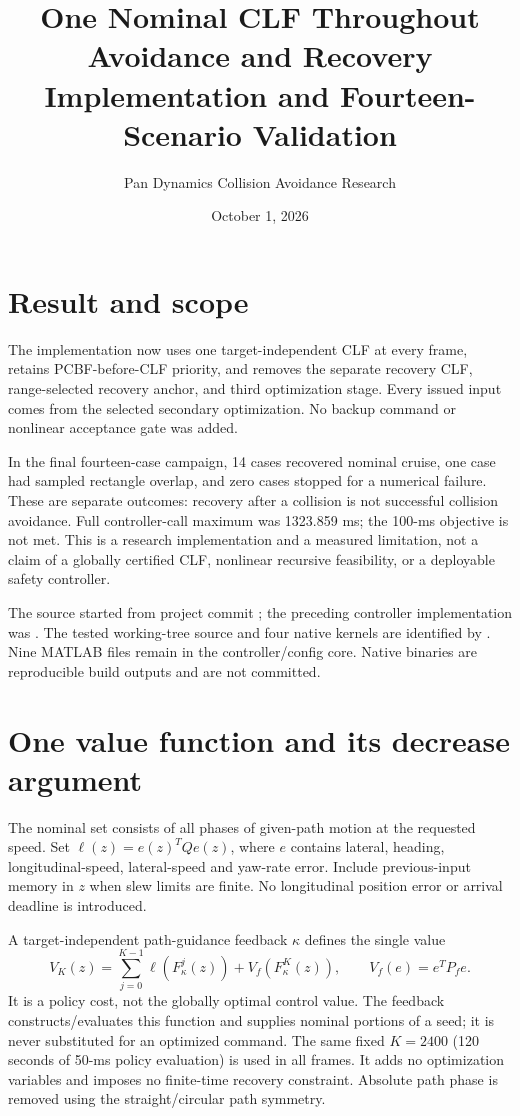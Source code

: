 \documentclass[11pt]{article}
\title{One Nominal CLF Throughout Avoidance and Recovery\\Implementation and Fourteen-Scenario Validation}
\author{Pan Dynamics Collision Avoidance Research}
\date{October 1, 2026}
\begin{document}
\maketitle
\section{Result and scope}
The implementation now uses one target-independent CLF at every frame,
retains PCBF-before-CLF priority, and removes the separate recovery CLF,
range-selected recovery anchor, and third optimization stage. Every issued
input comes from the selected secondary optimization. No backup command or
nonlinear acceptance gate was added.

In the final fourteen-case campaign, 14 cases recovered nominal
cruise, one case had sampled rectangle overlap, and zero
cases stopped for a numerical failure. These are separate outcomes: recovery
after a collision is not successful collision avoidance. Full controller-call
maximum was 1323.859 ms; the 100-ms objective is not met. This is a research
implementation and a measured limitation, not a claim of a globally certified
CLF, nonlinear recursive feasibility, or a deployable safety controller.

The source started from project commit
; the preceding controller
implementation was .
The tested working-tree source and four native kernels are identified by
. Nine MATLAB files remain in the controller/config
core. Native binaries are reproducible build outputs and are not committed.

\section{One value function and its decrease argument}
The nominal set consists of all phases of given-path motion at the requested
speed. Set $\ell(z)=e(z)^TQe(z)$, where $e$ contains lateral, heading,
longitudinal-speed, lateral-speed and yaw-rate error. Include previous-input
memory in $z$ when slew limits are finite. No longitudinal position error or
arrival deadline is introduced.

A target-independent path-guidance feedback $\kappa$ defines the single value
\[
 V_K(z)=\sum_{j=0}^{K-1}\ell(F_\kappa^j(z))
        +V_f(F_\kappa^K(z)),\qquad V_f(e)=e^TP_fe.
\]
It is a policy cost, not the globally optimal control value. The feedback
constructs/evaluates this function and supplies nominal portions of a seed;
it is never substituted for an optimized command. The same fixed $K=2400$
(120 seconds of 50-ms policy evaluation) is used in all frames. It adds no
optimization variables and imposes no finite-time recovery constraint.
Absolute path phase is removed using the straight/circular path symmetry.
\end{document}
